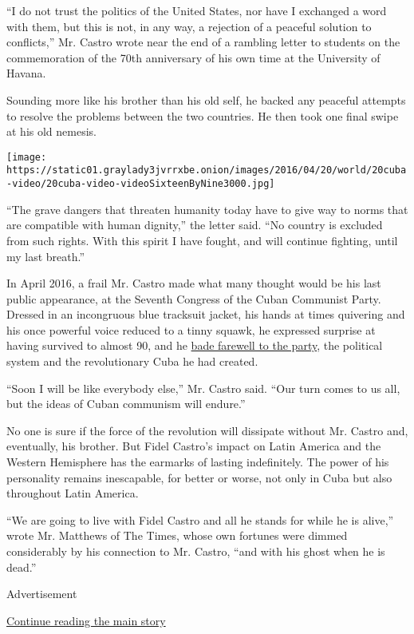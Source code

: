 ``I do not trust the politics of the United States, nor have I exchanged
a word with them, but this is not, in any way, a rejection of a peaceful
solution to conflicts,'' Mr. Castro wrote near the end of a rambling
letter to students on the commemoration of the 70th anniversary of his
own time at the University of Havana.

Sounding more like his brother than his old self, he backed any peaceful
attempts to resolve the problems between the two countries. He then took
one final swipe at his old nemesis.

\texttt{[image: https://static01.graylady3jvrrxbe.onion/images/2016/04/20/world/20cuba-video/20cuba-video-videoSixteenByNine3000.jpg]}

``The grave dangers that threaten humanity today have to give way to
norms that are compatible with human dignity,'' the letter said. ``No
country is excluded from such rights. With this spirit I have fought,
and will continue fighting, until my last breath.''

In April 2016, a frail Mr. Castro made what many thought would be his
last public appearance, at the Seventh Congress of the Cuban Communist
Party. Dressed in an incongruous blue tracksuit jacket, his hands at
times quivering and his once powerful voice reduced to a tinny squawk,
he expressed surprise at having survived to almost 90, and he
\href{http://www.nytimes3xbfgragh.onion/2016/04/20/world/americas/in-farewell-fidel-castro-urges-party-to-fulfill-vision-for-cuba.html}{bade
farewell to the party}, the political system and the revolutionary Cuba
he had created.

``Soon I will be like everybody else,'' Mr. Castro said. ``Our turn
comes to us all, but the ideas of Cuban communism will endure.''

No one is sure if the force of the revolution will dissipate without Mr.
Castro and, eventually, his brother. But Fidel Castro's impact on Latin
America and the Western Hemisphere has the earmarks of lasting
indefinitely. The power of his personality remains inescapable, for
better or worse, not only in Cuba but also throughout Latin America.

``We are going to live with Fidel Castro and all he stands for while he
is alive,'' wrote Mr. Matthews of The Times, whose own fortunes were
dimmed considerably by his connection to Mr. Castro, ``and with his
ghost when he is dead.''

Advertisement

\protect\hyperlink{after-bottom}{Continue reading the main story}

